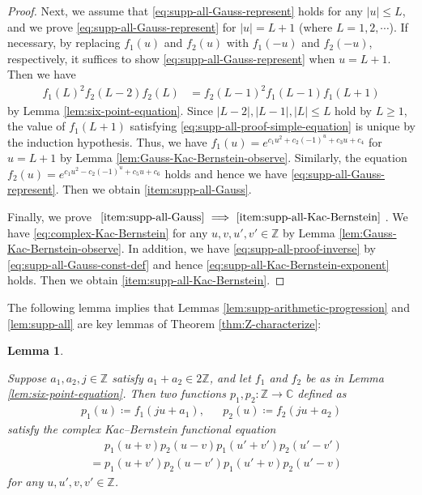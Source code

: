\documentclass[12pt]{article}
\newtheorem{lemma}[theorem]{Lemma}
\theoremstyle{definition}
\theoremstyle{remark}
\numberwithin{equation}{section}
\numberwithin{figure}{section}
\numberwithin{table}{section}
\begin{document}
\begin{proof}
Next, we assume that \eqref{eq:supp-all-Gauss-represent} holds for any $ | u | \leq L $, and we prove \eqref{eq:supp-all-Gauss-represent} for $ | u | = L + 1 $ (where $ L = 1 , 2 , \cdots $).
If necessary, by replacing $ f_1 ( u ) $ and $ f_2 ( u ) $ with $ f_1 ( - u ) $ and $ f_2 ( - u ) $, respectively, it suffices to show \eqref{eq:supp-all-Gauss-represent} when $ u = L + 1 $.
Then we have
\begin{align}
     f_1 ( L )^2 f_2 ( L - 2 ) f_2 ( L )
     & = f_2 ( L - 1 )^2 f_1 ( L - 1 ) f_1 ( L + 1 ) \label{eq:supp-all-proof-simple-equation}
\end{align}
by Lemma \ref{lem:six-point-equation}.
Since $ | L - 2 | , | L - 1 | , | L | \leq L $ hold by $ L \geq 1 $, the value of $ f_1 ( L + 1 ) $ satisfying \eqref{eq:supp-all-proof-simple-equation} is unique by the induction hypothesis.
Thus, we have $ f_1 ( u ) = e^{ c_1 u^2 + c_2 ( - 1 )^u + c_3 u + c_4 } $ for $ u = L + 1 $ by Lemma \ref{lem:Gauss-Kac-Bernstein-observe}.
Similarly, the equation $ f_2 ( u ) = e^{ c_1 u^2 - c_2 ( - 1 )^u + c_5 u + c_6 } $ holds and hence we have \eqref{eq:supp-all-Gauss-represent}.
Then we obtain \ref{item:supp-all-Gauss}.

Finally, we prove $ \text{ \ref{item:supp-all-Gauss} } \Longrightarrow \text{ \ref{item:supp-all-Kac-Bernstein} } $.
We have \eqref{eq:complex-Kac-Bernstein} for any $ u , v , u' , v' \in \mathbb{ Z } $ by Lemma \ref{lem:Gauss-Kac-Bernstein-observe}.
In addition, we have \eqref{eq:supp-all-proof-inverse} by \eqref{eq:supp-all-Gauss-const-def} and hence \eqref{eq:supp-all-Kac-Bernstein-exponent} holds.
Then we obtain \ref{item:supp-all-Kac-Bernstein}.
\end{proof}

The following lemma implies that Lemmas \ref{lem:supp-arithmetic-progression} and \ref{lem:supp-all} are key lemmas of Theorem \ref{thm:Z-characterize}:

\begin{lemma}
    \label{lem:scaling}

Suppose $ a_1 , a_2 , j \in \mathbb{ Z } $ satisfy $ a_1 + a_2 \in 2 \mathbb{ Z } $, and let $ f_1 $ and $ f_2 $ be as in Lemma \ref{lem:six-point-equation}.
Then two functions $ p_1 , p_2 \colon \mathbb{ Z } \to \mathbb{ C } $ defined as 
\begin{align}
    p_1 ( u ) \coloneqq f_1 ( j u + a_1 ), & &
    p_2 ( u ) \coloneqq f_2 ( j u + a_2 )
\end{align}
satisfy the complex Kac--Bernstein functional equation 
\begin{align}
  & \phantom{ {} = {} }  p_1 ( u + v ) p_2 ( u - v ) p_1 ( u' + v' ) p_2 ( u' - v' ) \\
  & = p_1 ( u + v' ) p_2 ( u - v' ) p_1 ( u' + v ) p_2 ( u' - v ) \label{eq:scaling-main}
\end{align}
for any $ u , u' , v , v' \in \mathbb{ Z } $.
    
\end{lemma}
\end{document}
